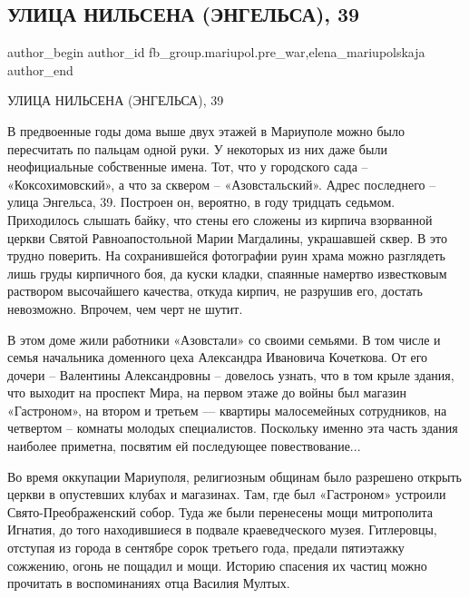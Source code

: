  
 
 
 
 

\subsection{УЛИЦА НИЛЬСЕНА (ЭНГЕЛЬСА), 39}
\label{sec:26_01_2023.fb.fb_group.mariupol.pre_war.1.ulitsa_nilsena__enge}
 
\ifcmt
 author_begin
   author_id fb_group.mariupol.pre_war,elena_mariupolskaja
 author_end
\fi

УЛИЦА НИЛЬСЕНА (ЭНГЕЛЬСА), 39

В предвоенные годы дома выше двух этажей в Мариуполе можно было пересчитать по
пальцам одной руки. У некоторых из них даже были неофициальные собственные
имена. Тот, что у городского сада – «Коксохимовский», а что за сквером –
«Азовстальский». Адрес последнего – улица Энгельса, 39. Построен он, вероятно,
в году тридцать седьмом. Приходилось слышать байку, что стены его сложены из
кирпича взорванной церкви Святой Равноапостольной Марии Магдалины, украшавшей
сквер. В это трудно поверить. На сохранившейся фотографии руин храма можно
разглядеть лишь груды кирпичного боя, да куски кладки, спаянные намертво
известковым раствором высочайшего качества, откуда кирпич, не разрушив его,
достать невозможно. Впрочем, чем черт не шутит.

В этом доме жили работники «Азовстали» со своими семьями. В том числе и семья
начальника доменного цеха Александра Ивановича Кочеткова. От его дочери –
Валентины Александровны – довелось узнать, что в том крыле здания, что выходит
на проспект Мира, на первом этаже до войны был магазин «Гастроном», на втором и
третьем — квартиры малосемейных сотрудников, на четвертом – комнаты молодых
специалистов. Поскольку именно эта часть здания наиболее приметна, посвятим ей
последующее повествование...

Во время оккупации Мариуполя, религиозным общинам было разрешено открыть церкви
в опустевших клубах и магазинах. Там, где был «Гастроном» устроили
Свято-Преображенский собор. Туда же были перенесены мощи митрополита Игнатия,
до того находившиеся в подвале краеведческого музея. Гитлеровцы, отступая из
города в сентябре сорок третьего года, предали пятиэтажку сожжению, огонь не
пощадил и мощи. Историю спасения их частиц можно прочитать в воспоминаниях отца
Василия Мултых.

